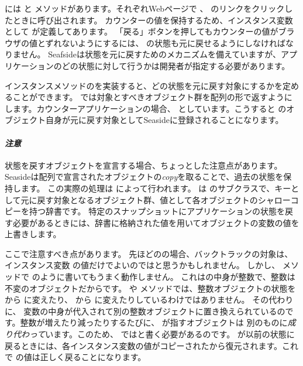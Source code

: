 \documentclass[a4paper,10pt,twoside]{book}
\begin{document}
 には  と メソッドがあります。それぞれWebページで \link{++} 、 \link{--\,--} のリンクをクリックしたときに呼び出されます。
カウンターの値を保持するため、インスタンス変数として が定義してあります。
「戻る」ボタンを押してもカウンターの値がブラウザの値とずれないようにするには、 の状態も元に戻せるようにしなければなりません。
Seafsideは状態を元に戻すためのメカニズムを備えていますが、アプリケーションのどの状態に対して行うかは開発者が指定する必要があります。

インスタンスメソッドのを実装すると、どの状態を元に戻す対象にするかを定めることができます。
 では対象とすべきオブジェクト群を配列の形で返すようにします。カウンターアプリケーションの場合、 としています。こうすると  のオブジェクト自身が元に戻す対象としてSeasideに登録されることになります。

\paragraph{\emph{注意}}
状態を戻すオブジェクトを宣言する場合、ちょっとした注意点があります。
Seasideは配列で宣言されたオブジェクトの\emph{copy}を取ることで、過去の状態を保持します。
この実際の処理は  によって行われます。 は  のサブクラスで、キーとして元に戻す対象となるオブジェクト群、値として各オブジェクトのシャローコピーを持つ辞書です。
特定のスナップショットにアプリケーションの状態を戻す必要があるときには、辞書に格納された値を用いてオブジェクトの変数の値を上書きします。

ここで注意すべき点があります。
先ほどのの場合、バックトラックの対象は、インスタンス変数 の値だけでよいのではと思うかもしれません。
しかし、 メソッドで のように書いてもうまく動作しません。
これはの中身が整数で、整数は不変のオブジェクトだからです。
  や  メソッドでは、整数オブジェクトの状態を から  に変えたり、 から に変えたりしているわけではありません。
その代わりに、  変数の中身が代入されて別の整数オブジェクトに置き換えられているのです。整数が増えたり減ったりするたびに、  が指すオブジェクトは 別のものに\emph{成り代わって}います。このため、 ではと書く必要があるのです。 \mbox{} が以前の状態に戻るときには、各インスタンス変数の値がコピーされた\mbox{}から復元されます。これで  の値は正しく戻ることになります。
\end{document}
